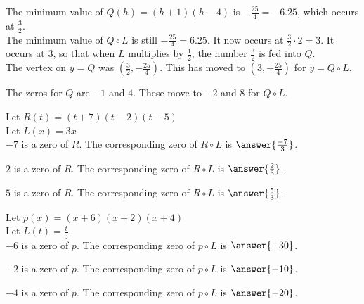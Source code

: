 \documentclass{ximera}
\begin{document}
The minimum value of $Q(h) = (h+1)(h-4)$ is $-\frac{25}{4} = -6.25$, which occurs at $\frac{3}{2}$. \\

The minimum value of $Q \circ L$ is still $-\frac{25}{4} = 6.25$. It now occurs at $\frac{3}{2} \cdot 2 = 3$.  It occurs at $3$, so that when $L$ multiplies by $\frac{1}{2}$, the number $\frac{3}{2}$ is fed into $Q$. \\


The vertex on $y = Q$ was $\left (\frac{3}{2}, -\frac{25}{4} \right)$. This has moved to $\left (3, -\frac{25}{4} \right)$ for $y = Q \circ L$.


The zeros for $Q$ are $-1$ and $4$.  These move to $-2$ and $8$ for $Q \circ L$.  




\begin{question}


Let $R(t) = (t+7)(t-2)(t-5)$ \\

Let $L(x) = 3x$ \\


$-7$ is a zero of $R$.  The corresponding zero of $R \circ L$ is $\answer{\frac{-7}{3}}$.

$2$ is a zero of $R$.  The corresponding zero of $R \circ L$ is $\answer{\frac{2}{3}}$.

$5$ is a zero of $R$.  The corresponding zero of $R \circ L$ is $\answer{\frac{5}{3}}$.


\end{question}












\begin{question}


Let $p(x) = (x+6)(x+2)(x+4)$ \\

Let $L(t) = \frac{t}{5}$ \\


$-6$ is a zero of $p$.  The corresponding zero of $p \circ L$ is $\answer{-30}$.

$-2$ is a zero of $p$.  The corresponding zero of $p \circ L$ is $\answer{-10}$.

$-4$ is a zero of $p$.  The corresponding zero of $p \circ L$ is $\answer{-20}$.


\end{question}
\end{document}
